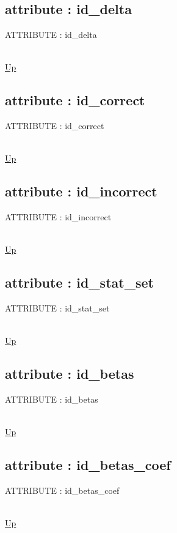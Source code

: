 \subsection*{attribute : id\_delta}
\hypertarget{ecldoc:logisticregression.constants.id_delta}{ATTRIBUTE : id\_delta} \\
\hyperlink{ecldoc:LogisticRegression.Constants}{Up} \\
\par
\subsection*{attribute : id\_correct}
\hypertarget{ecldoc:logisticregression.constants.id_correct}{ATTRIBUTE : id\_correct} \\
\hyperlink{ecldoc:LogisticRegression.Constants}{Up} \\
\par
\subsection*{attribute : id\_incorrect}
\hypertarget{ecldoc:logisticregression.constants.id_incorrect}{ATTRIBUTE : id\_incorrect} \\
\hyperlink{ecldoc:LogisticRegression.Constants}{Up} \\
\par
\subsection*{attribute : id\_stat\_set}
\hypertarget{ecldoc:logisticregression.constants.id_stat_set}{ATTRIBUTE : id\_stat\_set} \\
\hyperlink{ecldoc:LogisticRegression.Constants}{Up} \\
\par
\subsection*{attribute : id\_betas}
\hypertarget{ecldoc:logisticregression.constants.id_betas}{ATTRIBUTE : id\_betas} \\
\hyperlink{ecldoc:LogisticRegression.Constants}{Up} \\
\par
\subsection*{attribute : id\_betas\_coef}
\hypertarget{ecldoc:logisticregression.constants.id_betas_coef}{ATTRIBUTE : id\_betas\_coef} \\
\hyperlink{ecldoc:LogisticRegression.Constants}{Up} \\
\par
